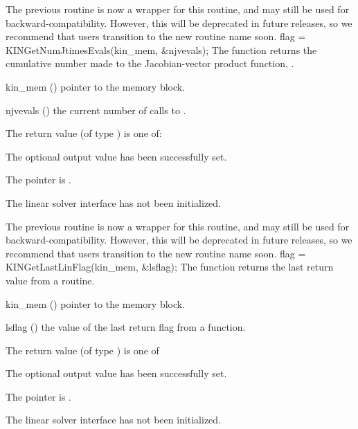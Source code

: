 {
  The previous routine  is now a wrapper for
  this routine, and may still be used for backward-compatibility.
  However, this will be deprecated in future releases, so we recommend
  that users transition to the new routine name soon.
}
{
  flag = KINGetNumJtimesEvals(kin\_mem, \&njvevals);
}
{
  The function  returns the
  cumulative number made to the Jacobian-vector product function,
  .
}
{
  \begin{args}
  \item[kin\_mem] ()
    pointer to the {\kinsol} memory block.
  \item[njvevals] ()
    the current number of calls to .
  \end{args}
}
{
  The return value  (of type ) is one of:
  \begin{args}
  \item[\Id{KINLS\_SUCCESS}]
    The optional output value has been successfully set.
  \item[\Id{KINLS\_MEM\_NULL}]
    The  pointer is .
  \item[\Id{KINLS\_LMEM\_NULL}]
    The {\kinls} linear solver interface has not been initialized.
  \end{args}
}
{
  The previous routine  is now a wrapper for
  this routine, and may still be used for backward-compatibility.
  However, this will be deprecated in future releases, so we recommend
  that users transition to the new routine name soon.
}
{
  flag = KINGetLastLinFlag(kin\_mem, \&lsflag);
}
{
  The function  returns the
  last return value from a {\kinls} routine.
}
{
  \begin{args}
  \item[kin\_mem] ()
    pointer to the {\kinsol} memory block.
  \item[lsflag] ()
    the value of the last return flag from a {\kinls} function.
  \end{args}
}
{
  The return value  (of type ) is one of
  \begin{args}
  \item[\Id{KINLS\_SUCCESS}]
    The optional output value has been successfully set.
  \item[\Id{KINLS\_MEM\_NULL}]
    The  pointer is .
  \item[\Id{KINLS\_LMEM\_NULL}]
    The {\kinls} linear solver interface has not been initialized.
  \end{args}
}
